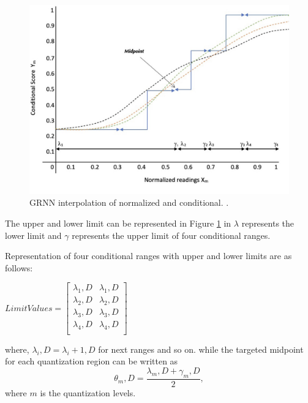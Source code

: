 \begin{figure}[ht]
    \includegraphics[width=\textwidth]{gfx/Quantizaton_Level.jpg}
    \captionsetup{justification=centering}
    \caption{GRNN interpolation of normalized and conditional.
        \cite{Islam2018CalculatingAH}.}
    \label{fig:Quant}
\end{figure}


The upper and lower limit can be represented in Figure \ref{fig:Quant} in $\lambda$ represents the lower limit and $\gamma$ represents the upper limit of four
conditional ranges.


Representation of four conditional ranges with upper and lower limits are as follows:
\begin{center}
    $Limit Values =
        \begin{bmatrix}
            \lambda_1,D & \lambda_1,D \\
            \lambda_2,D & \lambda_2,D \\
            \lambda_3,D & \lambda_3,D \\
            \lambda_4,D & \lambda_4,D \\
        \end{bmatrix}$
\end{center}

where, $\lambda_i,D = \lambda_i+1,D$ for next ranges and so on. while the targeted midpoint for each quantization
region can be written as
\begin{equation}\label{Equation:4.4}
    \theta_m,D = \frac{\lambda_m,D + \gamma_m,D}{2},
\end{equation}
where $m$ is the quantization levels.

